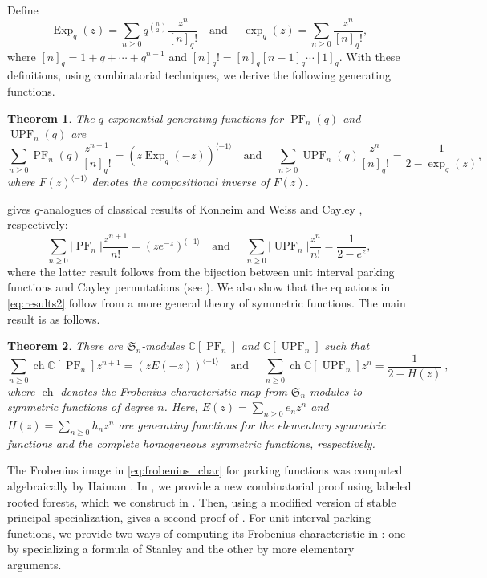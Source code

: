 \documentclass{amsart}
\renewcommand{\S}{\mathfrak{S}}
\newcommand{\CC}{\mathbb{C}}
\DeclareMathOperator{\PF}{PF}
\DeclareMathOperator{\UPF}{UPF} %
\DeclareMathOperator{\ch}{ch}
\DeclareMathOperator{\Exp}{Exp}
\newtheorem{theorem}{Theorem}[section]
\theoremstyle{definition}
\begin{document}
Define
\[\Exp_q(z)=\sum_{n\geq 0}q^{\binom{n}{2}}\frac{z^n}{[n]_q!}\quad \mbox{and }\quad\exp_q(z)=\sum_{n\geq 0}\frac{z^n}{[n]_q!},\]
where $[n]_q=1+q+\cdots+q^{n-1}$ and $[n]_q!=[n]_q[n-1]_q\cdots[1]_q$.
With these definitions, using combinatorial techniques, we derive the following generating functions. 
\begin{theorem}\label{eq:pf-upf-inv-gen-functs} The $q$-exponential generating functions for $\PF_n(q)$ and $\UPF_n(q)$ are 
    \[\sum_{n\geq 0}\PF_n(q)\frac{z^{n+1}}{[n]_{q}!}=(z\Exp_{q}(-z))^{\langle -1\rangle }\quad \mbox{and }\quad\sum_{n\geq 0}\UPF_n(q)\frac{z^{n}}{[n]_{q}!}=\frac{1}{2-\exp_q(z)},\]
    where $F(z)^{\langle -1\rangle}$ denotes the compositional inverse of $F(z)$.
\end{theorem}
  gives $q$-analogues of  classical results of Konheim and Weiss \cite{Konheim1966} and Cayley \cite{cayley1856}, respectively: 
\begin{equation}\label{eq:results2}
    \sum_{n\geq 0}|\PF_n|\frac{z^{n+1}}{n!}=(ze^{-z})^{\langle -1\rangle }\quad \mbox{and } \quad \sum_{n\geq 0}|\UPF_n|\frac{z^{n}}{n!}=\frac{1}{2-e^z},
\end{equation}
where the latter result follows from the bijection between unit interval parking functions and Cayley permutations (see \cite{bib:HadawayUndergradThesis}).
We also show that the equations in \eqref{eq:results2} follow from a more general theory of symmetric functions. The main result is as follows.
\begin{theorem}\label{eq:pf-upf-sym-gen-functs}There are $\S_n$-modules $\CC[\PF_n]$ and $\CC[\UPF_n]$ such that 
\begin{equation}\label{eq:frobenius_char}
    \sum_{n\geq 0}\ch\CC[\PF_n]z^{n+1}=(zE(-z))^{\langle -1\rangle }\quad \mbox{and } \quad \sum_{n\geq 0}\ch \CC[\UPF_n]z^n=\frac{1}{2-H(z)} \ ,
\end{equation}
where $\ch$ denotes the Frobenius characteristic map from $\S_n$-modules to symmetric functions of degree $n$.
Here,
$E(z)=\sum_{n\geq 0}e_nz^n$ and $H(z)=\sum_{n\geq 0}h_nz^n$
are generating functions for the elementary symmetric functions and the complete homogeneous symmetric functions, respectively.\end{theorem} 
The Frobenius image in \eqref{eq:frobenius_char} for parking functions was computed algebraically by Haiman \cite{haiman_conjectures_1994}. In , we provide a new combinatorial proof using labeled rooted forests, which we construct in . Then, using a modified version of stable principal specialization,  gives a second proof of . For unit interval parking functions, we provide two ways of computing its Frobenius characteristic in : one by specializing a formula of Stanley and the other by more elementary arguments.
\end{document}
